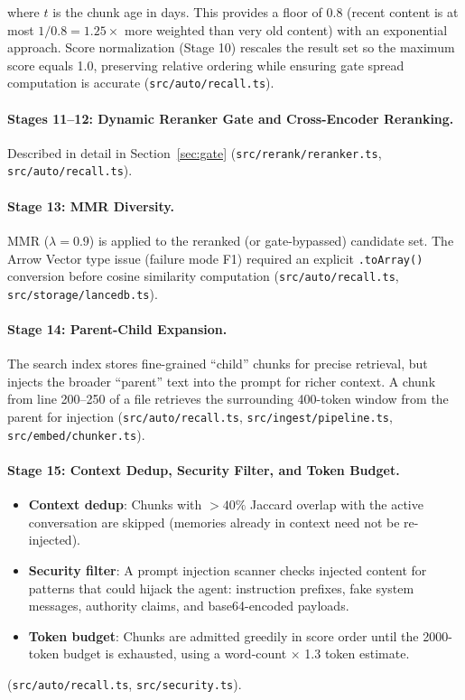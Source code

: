 \documentclass[11pt]{article}
\begin{document}
where $t$ is the chunk age in days. This provides a floor of 0.8 (recent content
is at most $1/0.8 = 1.25\times$ more weighted than very old content) with an exponential
approach. Score normalization (Stage 10) rescales the result set so the maximum score
equals 1.0, preserving relative ordering while ensuring gate spread computation is
accurate (\texttt{src/auto/recall.ts}).

\paragraph{Stages 11--12: Dynamic Reranker Gate and Cross-Encoder Reranking.}
Described in detail in Section~\ref{sec:gate} (\texttt{src/rerank/reranker.ts},
\texttt{src/auto/recall.ts}).

\paragraph{Stage 13: MMR Diversity.}
MMR ($\lambda=0.9$) is applied to the reranked (or gate-bypassed) candidate set.
The Arrow Vector type issue (failure mode F1) required an explicit \texttt{.toArray()}
conversion before cosine similarity computation (\texttt{src/auto/recall.ts},
\texttt{src/storage/lancedb.ts}).

\paragraph{Stage 14: Parent-Child Expansion.}
The search index stores fine-grained ``child'' chunks for precise retrieval, but injects
the broader ``parent'' text into the prompt for richer context. A chunk from line
200--250 of a file retrieves the surrounding 400-token window from the parent for
injection (\texttt{src/auto/recall.ts}, \texttt{src/ingest/pipeline.ts},
\texttt{src/embed/chunker.ts}).

\paragraph{Stage 15: Context Dedup, Security Filter, and Token Budget.}
\begin{itemize}[leftmargin=2em, itemsep=2pt]
  \item \textbf{Context dedup}: Chunks with $>40\%$ Jaccard overlap with the active
  conversation are skipped (memories already in context need not be re-injected).
  \item \textbf{Security filter}: A prompt injection scanner checks injected content for
  patterns that could hijack the agent: instruction prefixes, fake system messages,
  authority claims, and base64-encoded payloads.
  \item \textbf{Token budget}: Chunks are admitted greedily in score order until the
  2000-token budget is exhausted, using a word-count $\times$ 1.3 token estimate.
\end{itemize}
(\texttt{src/auto/recall.ts}, \texttt{src/security.ts}).
\end{document}
